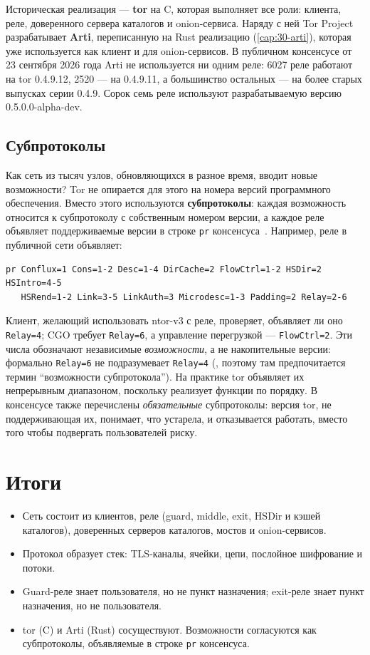 Историческая реализация --- \textbf{tor} на C, которая выполняет все роли: клиента, реле, доверенного сервера каталогов и onion-сервиса. Наряду с ней Tor Project разрабатывает \textbf{Arti}, переписанную на Rust реализацию (\cref{cap:30-arti}), которая уже используется как клиент и для onion-сервисов. В публичном консенсусе от 23 сентября 2026 года Arti не используется ни одним реле: 6027 реле работают на tor 0.4.9.12, 2520 --- на 0.4.9.11, а большинство остальных --- на более старых выпусках серии 0.4.9. Сорок семь реле используют разрабатываемую версию 0.5.0.0-alpha-dev.

\subsection{Субпротоколы}

Как сеть из тысяч узлов, обновляющихся в разное время, вводит новые возможности? Tor не опирается для этого на номера версий программного обеспечения. Вместо этого используются \textbf{субпротоколы}: каждая возможность относится к субпротоколу с собственным номером версии, а каждое реле объявляет поддерживаемые версии в строке \texttt{pr} консенсуса~. Например, реле в публичной сети объявляет:
\begin{lstlisting}[numbers=none]
pr Conflux=1 Cons=1-2 Desc=1-4 DirCache=2 FlowCtrl=1-2 HSDir=2 HSIntro=4-5
   HSRend=1-2 Link=3-5 LinkAuth=3 Microdesc=1-3 Padding=2 Relay=2-6
\end{lstlisting}
Клиент, желающий использовать ntor-v3 с реле, проверяет, объявляет ли оно \texttt{Relay=4}; CGO требует \texttt{Relay=6}, а управление перегрузкой --- \texttt{FlowCtrl=2}. Эти числа обозначают независимые \emph{возможности}, а не накопительные версии: формально \texttt{Relay=6} не подразумевает \texttt{Relay=4} (, поэтому там предпочитается термин \enquote{возможности субпротокола}). На практике tor объявляет их непрерывным диапазоном, поскольку реализует функции по порядку. В консенсусе также перечислены \emph{обязательные} субпротоколы: версия tor, не поддерживающая их, понимает, что устарела, и отказывается работать, вместо того чтобы подвергать пользователей риску.

\section*{Итоги}
\begin{itemize}
  \item Сеть состоит из клиентов, реле (guard, middle, exit, HSDir и кэшей каталогов), доверенных серверов каталогов, мостов и onion-сервисов.
  \item Протокол образует стек: TLS-каналы, ячейки, цепи, послойное шифрование и потоки.
  \item Guard-реле знает пользователя, но не пункт назначения; exit-реле знает пункт назначения, но не пользователя.
  \item tor (C) и Arti (Rust) сосуществуют. Возможности согласуются как субпротоколы, объявляемые в строке \texttt{pr} консенсуса.
\end{itemize}

